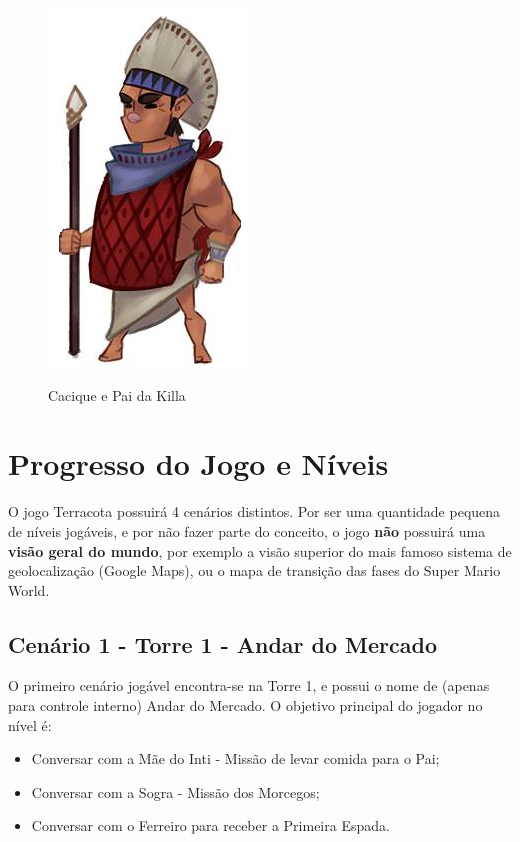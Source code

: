\documentclass[12pt]{article}
\begin{document}
\begin{figure}[!htb]
    \centering
    \includegraphics[scale=0.9]{cacique_pai_da_killa.jpg}
    \label{fig:cacique_pai_da_killa}
    \caption{Cacique e Pai da Killa}
\end{figure}

\newpage

\section{Progresso do Jogo e Níveis}
O jogo Terracota possuirá 4 cenários distintos. Por ser uma quantidade pequena de
níveis jogáveis, e por não fazer parte do conceito, o jogo {\bf não} possuirá uma
{\bf visão geral do mundo}, por exemplo a visão superior do mais famoso sistema
de geolocalização (Google Maps), ou o mapa de transição das fases do Super Mario
World.

\subsection{Cenário 1 - Torre 1 - Andar do Mercado}
O primeiro cenário jogável encontra-se na Torre 1, e possui o nome de (apenas
para controle interno) Andar do Mercado. O objetivo principal do jogador no
nível é:

\begin{itemize}
    \item Conversar com a Mãe do Inti - Missão de levar comida para o Pai;
    \item Conversar com a Sogra - Missão dos Morcegos;
    \item Conversar com o Ferreiro para receber a Primeira Espada.
\end{itemize}
\end{document}
